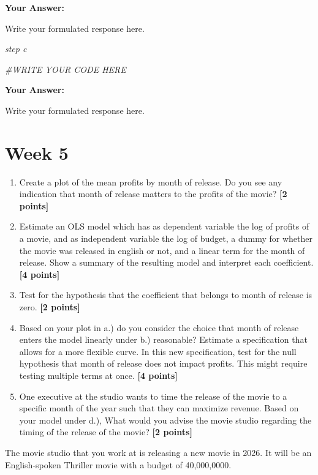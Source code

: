 \documentclass[
]{article}
\newenvironment{Shaded}{\begin{snugshade}}{\end{snugshade}}
\newcommand{\CommentTok}[1]{\textcolor[rgb]{0.56,0.35,0.01}{\textit{#1}}}
\begin{document}
\textbf{Your Answer:}

Write your formulated response here.

\emph{step c}

\begin{Shaded}
\begin{Highlighting}[]
\CommentTok{\#WRITE YOUR CODE HERE}
\end{Highlighting}
\end{Shaded}

\textbf{Your Answer:}

Write your formulated response here.

\section{Week 5}\label{week-5}

\begin{enumerate}
\def\labelenumi{\alph{enumi}.}
\item
  Create a plot of the mean profits by month of release. Do you see any
  indication that month of release matters to the profits of the movie?
  \textbf{[2 points]}
\item
  Estimate an OLS model which has as dependent variable the log of
  profits of a movie, and as independent variable the log of budget, a
  dummy for whether the movie was released in english or not, and a
  linear term for the month of release. Show a summary of the resulting
  model and interpret each coefficient. \textbf{[4 points]}
\item
  Test for the hypothesis that the coefficient that belongs to month of
  release is zero. \textbf{[2 points]}
\item
  Based on your plot in a.) do you consider the choice that month of
  release enters the model linearly under b.) reasonable? Estimate a
  specification that allows for a more flexible curve. In this new
  specification, test for the null hypothesis that month of release does
  not impact profits. This might require testing multiple terms at once.
  \textbf{[4 points]}
\item
  One executive at the studio wants to time the release of the movie to
  a specific month of the year such that they can maximize revenue.
  Based on your model under d.), What would you advise the movie studio
  regarding the timing of the release of the movie? \textbf{[2 points]}
\end{enumerate}

The movie studio that you work at is releasing a new movie in 2026. It
will be an English-spoken Thriller movie with a budget of 40,000,0000.
\end{document}
